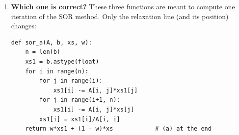 \begin{enumerate}
\begin{enumerate}
\item Define the system (\ref{eq:circuito-en}) in Python. Obtain the currents in all the branches of the circuit using a single NumPy function. Compute the condition number of the system and say how many significant digits you expect to be correct. Check that the junction rule holds at the three nodes.
\item Use the QR factorisation to obtain the solution again.
\item The system has zeros on the diagonal, so iterative methods cannot be applied to it directly. Reorder its equations using the permutation matrix of the LU factorisation, i.e. use $P^T\cdot A$ as the matrix of the system and $P^T\cdot b$ as the right-hand side. Compute the spectral radius of Jacobi's method and say whether it makes sense to use this method.
\item Use the damped Jacobi method with $\omega =0.1$ to compute the currents, with a tolerance of $10^{-5}$. Before running it, \emph{predict} from the spectral radius the number of iterations it will need (more than 3000). Compare the prediction with the result and compute the actual error of the solution. Is it smaller than the tolerance?
\item Use the SOR method with $\omega =0.2$ and the same tolerance. Give the number of iterations used and discuss which method works better.
\item Write a function that plots the spectral radius of the matrix of a relaxation method as a function of $\omega$. Use it for the methods of the previous two parts. Were the values of $\omega$ chosen reasonable?
\end{enumerate}

\item \label{ej:sor_correcta-en} \textbf{Which one is correct?} These three functions are meant to compute one iteration of the SOR method. Only the relaxation line (and its position) changes:
\begin{verbatim}
def sor_a(A, b, xs, w):
    n = len(b)
    xs1 = b.astype(float)
    for i in range(n):
        for j in range(i):
            xs1[i] -= A[i, j]*xs1[j]
        for j in range(i+1, n):
            xs1[i] -= A[i, j]*xs[j]
        xs1[i] = xs1[i]/A[i, i]
    return w*xs1 + (1 - w)*xs            # (a) at the end


\end{verbatim}
\end{enumerate}
